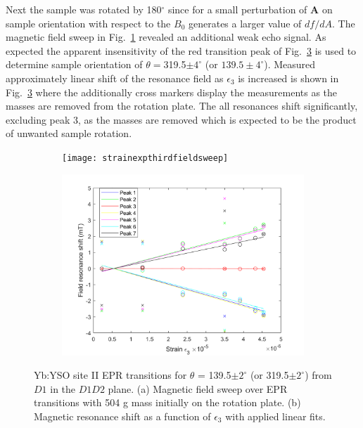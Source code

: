 Next the sample was rotated by 180$^{\circ}$ since for a small perturbation of $\bm{A}$ on sample orientation with respect to the $B_{0}$ generates a larger value of $df/dA$. The magnetic field sweep in Fig.~\ref{fig:strainexpthirdfieldsweep} revealed an additional weak echo signal. As expected the apparent insensitivity of the red transition peak of Fig.~\ref{fig:strainexpthird1} is used to determine sample orientation of $\theta=$319.5$\pm 4^{\circ}$ (or $139.5 \pm 4^{\circ}$). Measured approximately linear shift of the resonance field as $\epsilon_{3}$ is increased is shown in Fig.~\ref{fig:strainexpthird1} where the additionally cross markers display the measurements as the masses are removed from the rotation plate. The all resonances shift significantly, excluding peak 3, as the masses are removed which is expected to be the product of unwanted sample rotation. 

\begin{figure}[H]
    \centering
    \begin{subfigure}[b]{0.45\textwidth}
        \centering
        \texttt{[image: strainexpthirdfieldsweep]}
        \caption{\label{fig:strainexpthirdfieldsweep}}
    \end{subfigure}
    \begin{subfigure}[b]{0.45\textwidth}
        \centering
        \includegraphics[width=\textwidth]{strainexpthird1}
   \caption{\label{fig:strainexpthird1}}
   \end{subfigure}
   \caption{Yb:YSO site II EPR transitions for $\theta$ = 139.5$\pm 2^{\circ}$ (or 319.5$\pm 2^{\circ}$) from $D1$ in the $D1D2$ plane. (a) Magnetic field sweep over EPR transitions with 504 g mass initially on the rotation plate. (b) Magnetic resonance shift as a function of $\epsilon_{3}$ with applied linear fits.}
\end{figure}









